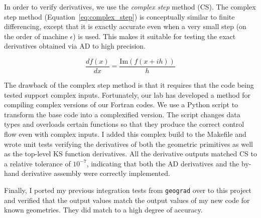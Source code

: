 \documentclass[11pt,letterpaper]{article}
\begin{document}
\qquad In order to verify derivatives, we use the \emph{complex step} method (CS).
The complex step method (Equation~\ref{eq:complex_step}) is conceptually similar to finite differencing, except that it is exactly accurate even when a very small step (on the order of machine $\epsilon$) is used.
This makes it suitable for testing the exact derivatives obtained via AD to high precision.

\begin{equation}
  \label{eq:complex_step}
  \frac{df(x)}{dx} = \frac{\text{Im}(f(x+ih))}{h}
\end{equation}

\qquad The drawback of the complex step method is that it requires that the code being tested support complex inputs.
Fortunately, our lab has developed a method for compiling complex versions of our Fortran codes.
We use a Python script to transform the base code into a complexified version.
The script changes data types and overloads certain functions so that they produce the correct control flow even with complex inputs.
I added this complex build to the Makefile and wrote unit tests verifying the derivatives of both the geometric primitives as well as the top-level KS function derivatives.
All the derivative outputs matched CS to a relative tolerance of $10^{-7}$, indicating that both the AD derivatives and the by-hand derivative assembly were correctly implemented.

\qquad Finally, I ported my previous integration tests from \texttt{geograd} over to this project and verified that the output values match the output values of my new code for known geometries.
They did match to a high degree of accuracy.
\end{document}
